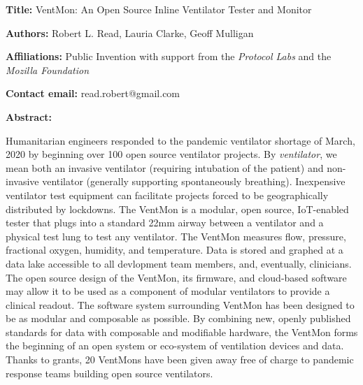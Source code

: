 \documentclass[11pt, letterpaper]{article}
\begin{document}
\begin{flushleft}


\setlength{\parindent}{0pt}
\setlength{\parskip}{10pt}

\textbf{Title:} VentMon: An Open Source Inline Ventilator Tester and Monitor

\textbf{Authors:} Robert L. Read, Lauria Clarke, Geoff Mulligan

\textbf{Affiliations:} Public Invention with support from the \textit{Protocol Labs} and the \textit{Mozilla Foundation}

\textbf{Contact email:} read.robert@gmail.com

\textbf{Abstract:}

Humanitarian engineers responded to the pandemic ventilator shortage of March, 2020
by beginning over 100 open source ventilator projects\cite{COVID19VENTLIST,pearce2020review}.
By {\em ventilator}, we mean both an invasive ventilator (requiring intubation of the patient) and non-invasive ventilator (generally supporting spontaneously breathing).
Inexpensive ventilator test equipment can facilitate projects forced to be geographically distributed by lockdowns.
The VentMon is a modular, open source, IoT-enabled tester that plugs into a standard 22mm airway between a ventilator and a physical test lung to test any ventilator.
The VentMon measures flow, pressure, fractional oxygen, humidity, and temperature.
Data is stored and graphed at a data lake accessible to all devlopment team members, and, eventually, clinicians.
The open source design of the VentMon,
its firmware, and cloud-based software may allow it to be used as a component of modular ventilators to provide a clinical readout.
The software system surrounding VentMon has been designed to be as modular and composable as possible.
By combining new, openly published standards for data with composable and modifiable hardware,
the VentMon forms the beginning of an open system or eco-system of ventilation devices and data.
Thanks to grants, 20 VentMons have been given away free of charge to pandemic response teams building open source ventilators.



\end{flushleft}
\end{document}
